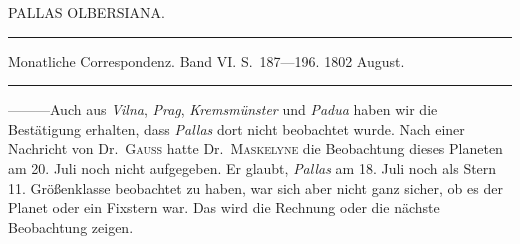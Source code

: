 %
\bigskip{}
\begin{center}
PALLAS OLBERSIANA.\par
\medskip\hrule\medskip
Monatliche Correspondenz. Band VI. S.\ 187—196. 1802 August.\par
\medskip\hrule
\end{center}\medskip
—\quad —\quad —\quad Auch aus \textit{Vilna}, \textit{Prag}, \textit{Kremsmünster} und \textit{Padua} haben wir die Bestätigung erhalten, dass \textit{Pallas} dort nicht beobachtet wurde. Nach einer Nachricht von Dr.\ \textsc{Gauß} hatte Dr.\ \textsc{Maskelyne} die Beobachtung dieses Planeten am 20. Juli noch nicht aufgegeben. Er glaubt, \textit{Pallas} am 18. Juli noch als Stern 11. Größenklasse beobachtet zu haben, war sich aber nicht ganz sicher, ob es der Planet oder ein Fixstern war. Das wird die Rechnung oder die nächste Beobachtung zeigen.

